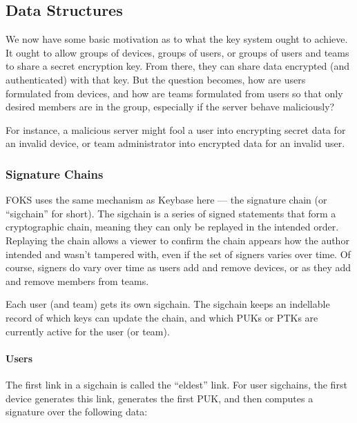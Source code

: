 \subsection{Data Structures}

We now have some basic motivation as to what the key system ought to achieve.
It ought to allow groups of devices, groups of users, or groups of users
and teams to share a secret encryption key. From there, they can share data
encrypted (and authenticated) with that key. But the question becomes,
how are users formulated from devices, and how are teams formulated from users
so that only desired members are in the group, especially if the server
behave maliciously?

For instance, a malicious server might fool a user into encrypting secret data
for an invalid device, or team administrator into encrypted data for an invalid
user.

\subsubsection{Signature Chains}
\label{sec:sigchains}

FOKS uses the same mechanism as Keybase here --- the signature chain (or
``sigchain'' for short).  The sigchain is a series of signed statements that
form a cryptographic chain, meaning they can only be replayed in the intended
order. Replaying the chain allows a viewer to confirm the chain appears how the
author intended and wasn't tampered with, even if the set of signers varies over
time. Of course, signers do vary over time as users add and remove devices, or
as they add and remove members from teams.

Each user (and team) gets its own sigchain. The sigchain keeps an indellable record
of which keys can update the chain, and which PUKs or PTKs are currently
active for the user (or team).

\paragraph{Users} The first link in a sigchain is called the ``eldest'' link. For user sigchains,
the first device generates this link, generates the first PUK, and then computes
a signature over the following data:

